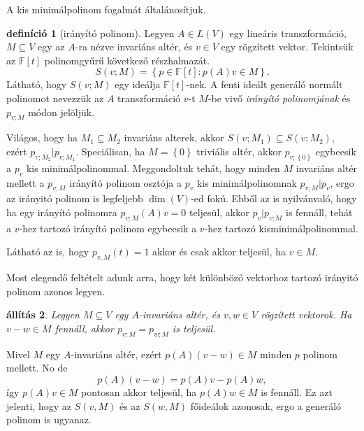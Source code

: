 \documentclass[a4paper, showtrims]{memoir}
\makeatletter
\renewenvironment{proof}[1][\proofname]
    {\par\pushQED{\qed}%
    \normalfont \topsep6\p@\@plus6\p@\relax
    \trivlist
    \item[\hskip\labelsep
        \itshape
    #1\@addpunct{:}]\ignorespaces}
    {\popQED\endtrivlist\@endpefalse}
\theoremstyle{plain}
\newtheorem{proposition}{állítás}[chapter]
\theoremstyle{remark}
\theoremstyle{definition}
\newtheorem{definition}[proposition]{definíció}
\makeatother
\begin{document}
A kis minimálpolinom fogalmát általánosítjuk.
\begin{definition}[irányító polinom]
    Legyen $A\in L\left( V \right)$ egy lineáris transzformáció,
    $M\subseteq V$ egy az $A$-ra nézve invariáns altér, 
    és $v\in V$ egy rögzített vektor.
    Tekintsük az $\mathbb{F}\left[ t \right]$ polinomgyűrű következő részhalmazát.
    \[
        S\left( v;M \right)
        =
        \left\{ p\in\mathbb{F}\left[ t \right]:p\left( A \right)v\in M \right\}.
    \]
    Látható, hogy $S\left( v;M \right)$ egy ideálja $\mathbb{F}\left[ t \right]$-nek.
    A fenti ideált generáló normált polinomot nevezzük az $A$ transzformáció $v$-t $M$-be vivő \emph{irányító polinomjának}
    és $p_{v;M}$ módon jelöljük.
\end{definition}
Világos, hogy ha $M_1\subseteq M_2$ invariáns alterek, akkor $S\left( v;M_1 \right)\subseteq S\left( v;M_2 \right)$, 
ezért $p_{v;M_2}|p_{v;M_1}$.
Speciálisan, ha $M=\left\{ 0 \right\}$ triviális altér, akkor $p_{v;\left\{ 0 \right\}}$ egybeesik a $p_{v}$ kis minimálpolinommal.
Meggondoltuk tehát, hogy minden $M$ invariáns altér mellett a $p_{v;M}$ irányító polinom osztója a $p_v$ kis minimálpolinomnak $p_{v;M}|p_v$, ergo az irányitó polinom is legfeljebb $\dim\left( V \right)$-ed fokú.
Ebből az is nyilvánvaló, hogy ha egy irányító polinomra $p_{v;M}\left( A \right)v=0$ teljesül,
akkor $p_{v}|p_{v;M}$ is fennáll, 
tehát a $v$-hez tartozó irányító polinom egybeesik a $v$-hez tartozó kisminimálpolinommal.

Látható az is, hogy $p_{v,M}\left( t \right)=1$ akkor és csak akkor teljesül, ha $v\in M$.

Most elegendő feltételt adunk arra, 
hogy két különböző vektorhoz tartozó irányitó polinom azonos legyen.
\begin{proposition}
    Legyen $M\subseteq V$ egy $A$-invariáns altér, 
    és $v,w\in V$ rögzített vektorok.
    Ha $v-w\in M$ fennáll, akkor $p_{v;M}=p_{w;M}$ is teljesül.
\end{proposition}
\begin{proof}
    Mivel $M$ egy $A$-invariáns altér, ezért $p\left( A \right)\left( v-w \right)\in M$ minden $p$ polinom mellett.
    No de
    \[
        p\left( A \right)\left( v-w \right)=p\left( A \right)v-p\left( A \right)w,
    \]
    így $p\left( A \right)v\in M$ pontosan akkor teljesül, ha $p\left( A \right)w\in M$ is fennáll.
    Ez azt jelenti, hogy az $S\left( v,M \right)$ és az $S\left( w,M \right)$ főideálok azonosak,
    ergo a generáló polinom is ugyanaz.
\end{proof}
\end{document}
